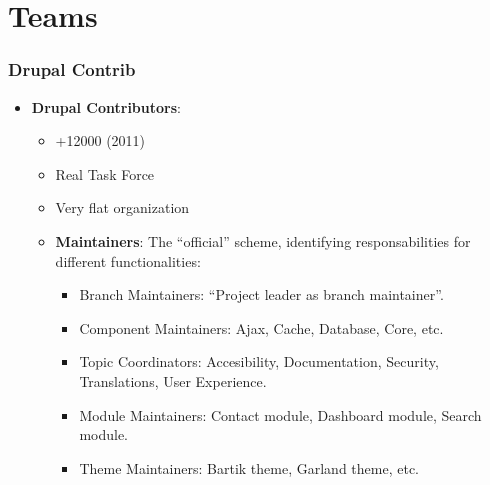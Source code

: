 \section{Teams}

\begin{frame}[allowframebreaks]
\frametitle{Drupal Contrib}

\begin{itemize}
\item \textbf{Drupal Contributors}: 
\begin{itemize}
\item {+12000 (2011)}
\item {Real Task Force}
\item {Very flat organization}
\item {\textbf{Maintainers}}: The ``official'' scheme, identifying responsabilities for different functionalities:
\begin{itemize}
\item {Branch Maintainers}: ``Project leader as branch maintainer''.
\item {Component Maintainers}: Ajax, Cache, Database, Core, etc.
\item {Topic Coordinators}: Accesibility, Documentation, Security, Translations, User Experience.
\item {Module Maintainers}: Contact module, Dashboard module, Search module.
\item {Theme Maintainers}: Bartik theme, Garland theme, etc.
\end{itemize}
\end{itemize}
\end{itemize}

\end{frame}
